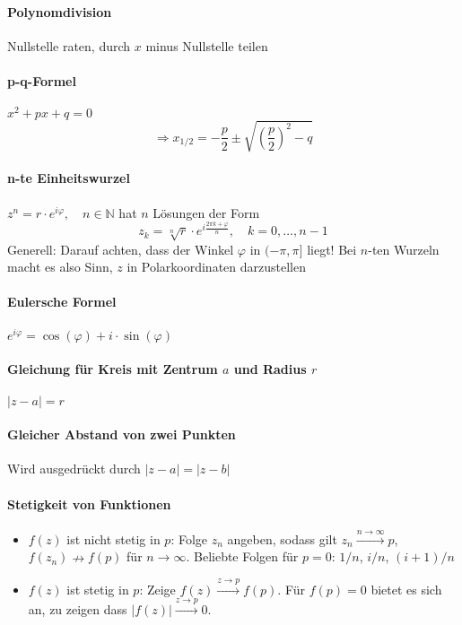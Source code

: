 \documentclass[a4paper, 10pt, DIV20, headings=small]{scrartcl}
\theoremstyle{definition}
\theoremstyle{plain}
\begin{document}
\paragraph{Polynomdivision}
Nullstelle raten, durch $x$ minus Nullstelle teilen

\paragraph{p-q-Formel}
$x^2 + px +q = 0$
$$\Rightarrow x_{1/2} = - \frac{p}{2} \pm \sqrt{\left(\frac{p}{2}\right)^2 - q}$$

\paragraph{n-te Einheitswurzel}
$z^n = r \cdot e^{i \varphi}, \quad n \in \mathbb{N}$
hat $n$ Lösungen der Form
$$z_k = \sqrt[n]{r} \cdot e^{i \frac{2\pi k + \varphi}{n}}, \quad k = 0, \ldots, n-1$$
Generell: Darauf achten, dass der Winkel $\varphi$ in $(-\pi,\pi]$ liegt!
Bei $n$-ten Wurzeln macht es also Sinn, $z$ in Polarkoordinaten darzustellen

\paragraph{Eulersche Formel}
$e^{i \varphi} = \cos(\varphi) + i \cdot \sin(\varphi)$

\paragraph{Gleichung für Kreis mit Zentrum $a$ und Radius $r$}
$|z-a| = r$

\paragraph{Gleicher Abstand von zwei Punkten}
Wird ausgedrückt durch $|z-a| = |z-b|$

\paragraph{Stetigkeit von Funktionen}
\begin{itemize}
\item $f(z)$ ist nicht stetig in $p$: Folge $z_n$ angeben, sodass gilt $z_n \overset{n \rightarrow \infty}{\longrightarrow} p$, $f(z_n) \nrightarrow f(p)$ für $n \rightarrow \infty$. Beliebte Folgen für $p=0$: $1/n$, $i/n$, $(i+1)/n$
\item $f(z)$ ist stetig in $p$: Zeige $f(z) \overset{z \rightarrow p}{\longrightarrow} f(p)$. Für $f(p)=0$ bietet es sich an, zu zeigen dass $|f(z)| \overset{z \rightarrow p}{\longrightarrow} 0$.
\end{itemize}
\end{document}
